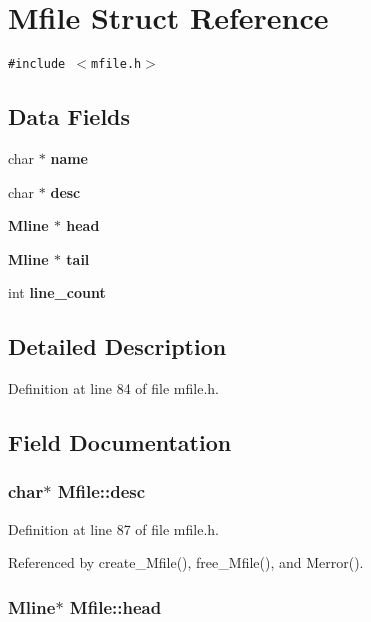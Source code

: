 \section{Mfile Struct Reference}
\label{structMfile}
{\tt \#include $<$mfile.h$>$}

\subsection*{Data Fields}
\begin{CompactItemize}
\item 
char $\ast$ \bf{name}
\item 
char $\ast$ \bf{desc}
\item 
\bf{Mline} $\ast$ \bf{head}
\item 
\bf{Mline} $\ast$ \bf{tail}
\item 
int \bf{line\_\-count}
\end{CompactItemize}


\subsection{Detailed Description}




Definition at line 84 of file mfile.h.

\subsection{Field Documentation}
\subsubsection{\setlength{\rightskip}{0pt plus 5cm}char$\ast$ \bf{Mfile::desc}}\label{structMfile_75a088c711f5c18f95652e0451f1d4b0}




Definition at line 87 of file mfile.h.

Referenced by create\_\-Mfile(), free\_\-Mfile(), and Merror().
\subsubsection{\setlength{\rightskip}{0pt plus 5cm}\bf{Mline}$\ast$ \bf{Mfile::head}}\label{structMfile_14cba0414626c23a2cf92f7e84ff3d3b}




